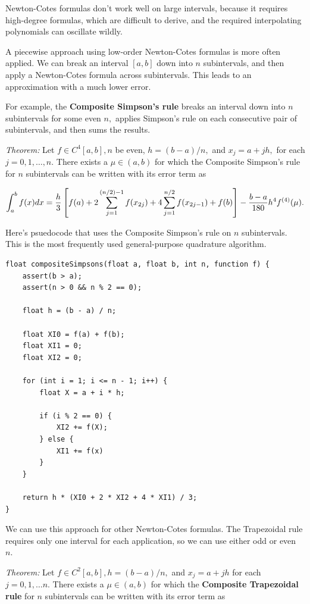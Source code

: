 \documentclass{article}
\begin{document}
Newton-Cotes formulas don't work well on large intervals, because it requires high-degree formulas, which are difficult to derive, and the required interpolating polynomials can oscillate wildly.

A piecewise approach using low-order Newton-Cotes formulas is more often applied. We can break an interval $[a, b]$ down into $n$ subintervals, and then apply a Newton-Cotes formula across subintervals. This leads to an approximation with a much lower error.

For example, the \textbf{Composite Simpson's rule} breaks an interval down into $n$ subintervals for some even $n,$ applies Simpson's rule on each consecutive pair of subintervals, and then sums the results.

\emph{Theorem:} Let $f \in C^4[a,b], n$ be even, $h = (b - a)/n,$ and $x_j = a + jh,$ for each $j = 0, 1, \dots, n.$ There exists a $\mu \in (a, b)$ for which the Composite Simpson's rule for $n$ subintervals can be written with its error term as

\[ \int_a^{b} f(x) dx = \frac{h}{3} \left[f(a) + 2 \sum_{j=1}^{(n/2) - 1} f(x_{2j}) + 4 \sum_{j=1}^{n/2} f(x_{2j -1}) + f(b)\right]  - \frac{b - a}{180}h^4 f^{(4)}(\mu). \]

Here's psuedocode that uses the Composite Simpson's rule on $n$ subintervals. This is the most frequently used general-purpose quadrature algorithm.

\begin{verbatim}
float compositeSimpsons(float a, float b, int n, function f) {
    assert(b > a);
    assert(n > 0 && n % 2 == 0);

    float h = (b - a) / n;

    float XI0 = f(a) + f(b);
    float XI1 = 0;
    float XI2 = 0;

    for (int i = 1; i <= n - 1; i++) {
        float X = a + i * h;

        if (i % 2 == 0) {
            XI2 += f(X);
        } else {
            XI1 += f(x)
        }
    }

    return h * (XI0 + 2 * XI2 + 4 * XI1) / 3;
}
\end{verbatim}

We can use this approach for other Newton-Cotes formulas. The Trapezoidal rule requires only one interval for each application, so we can use either odd or even $n.$

\emph{Theorem:} Let $f \in C^2[a,b], h = (b - a)/n,$ and $x_j = a + jh$ for each $j = 0, 1, \dots n.$ There exists a $\mu \in (a,b)$ for which the \textbf{Composite Trapezoidal rule} for $n$ subintervals can be written with its error term as
\end{document}
